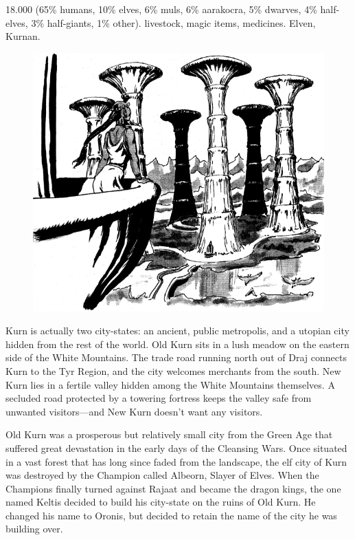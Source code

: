 
{18.000 (65\% humans, 10\% elves, 6\% muls, 6\% aarakocra, 5\% dwarves, 4\% half-elves, 3\% half-giants, 1\% other).}
{livestock, magic items, medicines.}
{Elven, Kurnan.}
{
\begin{figure}[b!]
\centering
\includegraphics[height=0.4\paperheight]{images/kurn-1.png}
\WOTC
\end{figure}
	Kurn is actually two city-states: an ancient, public metropolis, and a utopian city hidden from the rest of the world. Old Kurn sits in a lush meadow on the eastern side of the White Mountains. The trade road running north out of Draj connects Kurn to the Tyr Region, and the city welcomes merchants from the south. New Kurn lies in a fertile valley hidden among the White Mountains themselves. A secluded road protected by a towering fortress keeps the valley safe from unwanted visitors---and New Kurn doesn't want any visitors.

	Old Kurn was a prosperous but relatively small city from the Green Age that suffered great devastation in the early days of the Cleansing Wars. Once situated in a vast forest that has long since faded from the landscape, the elf city of Kurn was destroyed by the Champion called Albeorn, Slayer of Elves. When the Champions finally turned against Rajaat and became the dragon kings, the one named Keltis decided to build his city-state on the ruins of Old Kurn. He changed his name to Oronis, but decided to retain the name of the city he was building over.

}

